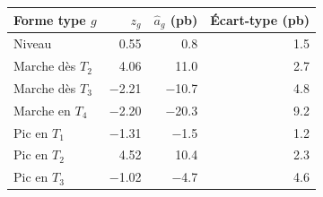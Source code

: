 {\small\begin{tabular}{lrrr}
\toprule
Forme type $g$ & $z_g$ & $\hat a_g$ (pb) & Écart-type (pb) \\
\midrule
Niveau & \num{0.55} & \num{0.8} & \num{1.5} \\
Marche dès $T_2$ & \num{4.06} & \num{11.0} & \num{2.7} \\
Marche dès $T_3$ & \num{-2.21} & \num{-10.7} & \num{4.8} \\
Marche en $T_4$ & \num{-2.20} & \num{-20.3} & \num{9.2} \\
Pic en $T_1$ & \num{-1.31} & \num{-1.5} & \num{1.2} \\
Pic en $T_2$ & \num{4.52} & \num{10.4} & \num{2.3} \\
Pic en $T_3$ & \num{-1.02} & \num{-4.7} & \num{4.6} \\
\bottomrule
\end{tabular}}
